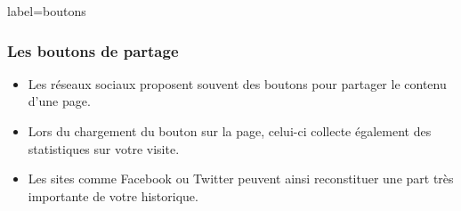 \documentclass{beamer}
\begin{document}
        \begin{frame}{label=boutons}
            \frametitle{Les boutons de partage}
            \begin{center}
                \begin{itemize}
                    \item Les réseaux sociaux proposent souvent des boutons pour partager le contenu d'une page.
                    \item Lors du chargement du bouton sur la page, celui-ci collecte également des statistiques sur votre visite.
                    \item Les sites comme Facebook ou Twitter peuvent ainsi reconstituer une part très importante de votre historique.
                \end{itemize}
            \end{center}
        \end{frame}
\end{document}
